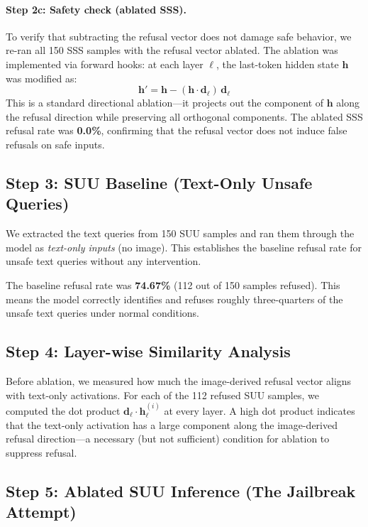 \documentclass[11pt]{article}
\begin{document}
\paragraph{Step 2c: Safety check (ablated SSS).} To verify that subtracting the refusal vector does not damage safe behavior, we re-ran all 150 SSS samples with the refusal vector ablated. The ablation was implemented via forward hooks: at each layer $\ell$, the last-token hidden state $\mathbf{h}$ was modified as:
\begin{equation}
    \mathbf{h}' = \mathbf{h} - (\mathbf{h} \cdot \mathbf{d}_\ell)\, \mathbf{d}_\ell
\end{equation}
This is a standard directional ablation---it projects out the component of $\mathbf{h}$ along the refusal direction while preserving all orthogonal components. The ablated SSS refusal rate was \textbf{0.0\%}, confirming that the refusal vector does not induce false refusals on safe inputs.

\subsection{Step 3: SUU Baseline (Text-Only Unsafe Queries)}

We extracted the text queries from 150 SUU samples and ran them through the model as \textit{text-only inputs} (no image). This establishes the baseline refusal rate for unsafe text queries without any intervention.

The baseline refusal rate was \textbf{74.67\%} (112 out of 150 samples refused). This means the model correctly identifies and refuses roughly three-quarters of the unsafe text queries under normal conditions.

\subsection{Step 4: Layer-wise Similarity Analysis}

Before ablation, we measured how much the image-derived refusal vector aligns with text-only activations. For each of the 112 refused SUU samples, we computed the dot product $\mathbf{d}_\ell \cdot \mathbf{h}_\ell^{(i)}$ at every layer. A high dot product indicates that the text-only activation has a large component along the image-derived refusal direction---a necessary (but not sufficient) condition for ablation to suppress refusal.

\subsection{Step 5: Ablated SUU Inference (The Jailbreak Attempt)}
\end{document}
